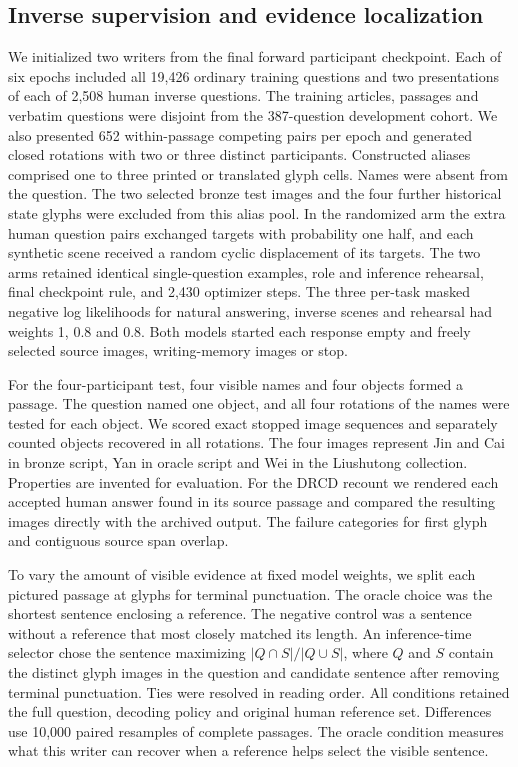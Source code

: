 \subsection*{Inverse supervision and evidence localization}
We initialized two writers from the final forward participant checkpoint. Each of six epochs included all 19,426 ordinary training questions and two presentations of each of 2,508 human inverse questions. The training articles, passages and verbatim questions were disjoint from the 387-question development cohort. We also presented 652 within-passage competing pairs per epoch and generated closed rotations with two or three distinct participants. Constructed aliases comprised one to three printed or translated glyph cells. Names were absent from the question. The two selected bronze test images and the four further historical state glyphs were excluded from this alias pool. In the randomized arm the extra human question pairs exchanged targets with probability one half, and each synthetic scene received a random cyclic displacement of its targets. The two arms retained identical single-question examples, role and inference rehearsal, final checkpoint rule, and 2,430 optimizer steps. The three per-task masked negative log likelihoods for natural answering, inverse scenes and rehearsal had weights 1, 0.8 and 0.8. Both models started each response empty and freely selected source images, writing-memory images or stop.

For the four-participant test, four visible names and four objects formed a passage. The question named one object, and all four rotations of the names were tested for each object. We scored exact stopped image sequences and separately counted objects recovered in all rotations. The four images represent Jin and Cai in bronze script, Yan in oracle script and Wei in the Liushutong collection. Properties are invented for evaluation. For the DRCD recount we rendered each accepted human answer found in its source passage and compared the resulting images directly with the archived output. The failure categories for first glyph and contiguous source span overlap.

To vary the amount of visible evidence at fixed model weights, we split each pictured passage at glyphs for terminal punctuation. The oracle choice was the shortest sentence enclosing a reference. The negative control was a sentence without a reference that most closely matched its length. An inference-time selector chose the sentence maximizing $|Q\cap S|/|Q\cup S|$, where $Q$ and $S$ contain the distinct glyph images in the question and candidate sentence after removing terminal punctuation. Ties were resolved in reading order. All conditions retained the full question, decoding policy and original human reference set. Differences use 10,000 paired resamples of complete passages. The oracle condition measures what this writer can recover when a reference helps select the visible sentence.
